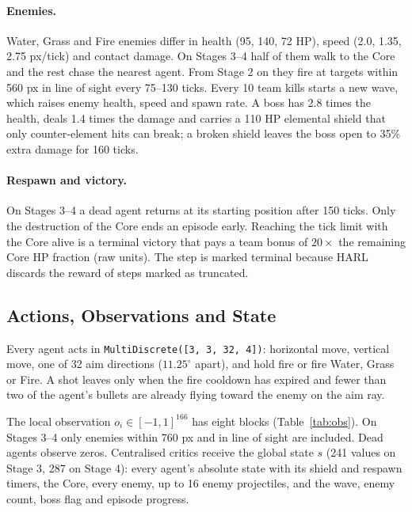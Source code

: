 \documentclass[11pt]{article}
\begin{document}
\paragraph{Enemies.} Water, Grass and Fire enemies differ in health (95, 140, 72 HP), speed (2.0, 1.35, 2.75 px/tick) and contact damage. On Stages 3--4 half of them walk to the Core and the rest chase the nearest agent. From Stage 2 on they fire at targets within 560 px in line of sight every 75--130 ticks. Every 10 team kills starts a new wave, which raises enemy health, speed and spawn rate. A boss has 2.8 times the health, deals 1.4 times the damage and carries a 110 HP elemental shield that only counter-element hits can break; a broken shield leaves the boss open to 35\% extra damage for 160 ticks.

\paragraph{Respawn and victory.} On Stages 3--4 a dead agent returns at its starting position after 150 ticks. Only the destruction of the Core ends an episode early. Reaching the tick limit with the Core alive is a terminal victory that pays a team bonus of $20 \times$ the remaining Core HP fraction (raw units). The step is marked terminal because HARL discards the reward of steps marked as truncated.

\subsection{Actions, Observations and State}

Every agent acts in \texttt{MultiDiscrete([3, 3, 32, 4])}: horizontal move, vertical move, one of 32 aim directions ($11.25^\circ$ apart), and hold fire or fire Water, Grass or Fire. A shot leaves only when the fire cooldown has expired and fewer than two of the agent's bullets are already flying toward the enemy on the aim ray.

The local observation $o_i \in [-1, 1]^{166}$ has eight blocks (Table~\ref{tab:obs}). On Stages 3--4 only enemies within 760 px and in line of sight are included. Dead agents observe zeros. Centralised critics receive the global state $s$ (241 values on Stage 3, 287 on Stage 4): every agent's absolute state with its shield and respawn timers, the Core, every enemy, up to 16 enemy projectiles, and the wave, enemy count, boss flag and episode progress.
\end{document}
